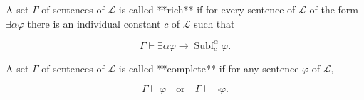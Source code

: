 A set $\Gamma$ of sentences of $\mathcal{L}$ is called **rich** if for every sentence of $\mathcal{L}$ of the form $\exists\alpha\varphi$ there is an individual constant $c$ of $\mathcal{L}$ such that

$$\Gamma \vdash \exists\alpha\varphi \rightarrow \operatorname{Subf}_c^\alpha\varphi.$$

A set $\Gamma$ of sentences of $\mathcal{L}$ is called **complete** if for any sentence $\varphi$ of $\mathcal{L}$,

$$\Gamma \vdash \varphi \quad\text{or}\quad \Gamma \vdash \neg\varphi.$$
